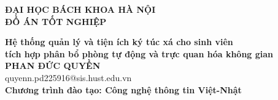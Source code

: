 \documentclass[DoAn.tex]{subfiles}
\begin{document}
\begin{titlepage}
\thispagestyle{empty}
\begin{center}

{\textbf{\large{ĐẠI HỌC BÁCH KHOA HÀ NỘI}}}\\[4cm]

{\textbf{\huge{ĐỒ ÁN TỐT NGHIỆP}}}\\[1cm]
{\textbf{\Large{Hệ thống quản lý và tiện ích ký túc xá cho sinh viên\\
tích hợp phân bổ phòng tự động và trực quan hóa không gian}}\\[1cm]

{\textbf{\large{PHAN ĐỨC QUYỀN}}}\\
{\large{quyenn.pd225916@sis.hust.edu.vn}}\\[0.5cm]

{\textbf{\large{Chương trình đào tạo: Công nghệ thông tin Việt-Nhật}}}\\

\vspace{4cm}
\begin{table}[H]
\centering
{}
\end{table}}
\end{center}

\end{titlepage}
\end{document}
